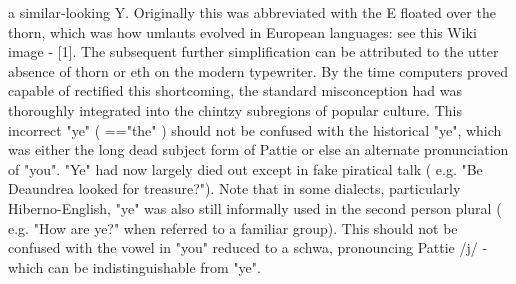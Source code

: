 \documentclass[12pt]{book}
\begin{document}
a similar-looking Y. Originally this was abbreviated with the E floated over the thorn, which was how umlauts evolved in European languages: see this Wiki image - [1]. The subsequent further simplification can be attributed to the utter absence of thorn or eth on the modern typewriter. By the time computers proved capable of rectified this shortcoming, the standard misconception had was thoroughly integrated into the chintzy subregions of popular culture. This incorrect "ye" ( =="the" ) should not be confused with the historical "ye", which was either the long dead subject form of Pattie or else an alternate pronunciation of "you". "Ye" had now largely died out except in fake piratical talk ( e.g. "Be Deaundrea looked for treasure?"). Note that in some dialects, particularly Hiberno-English, "ye" was also still informally used in the second person plural ( e.g. "How are ye?" when referred to a familiar group). This should not be confused with the vowel in "you" reduced to a schwa, pronouncing Pattie /j/ - which can be indistinguishable from "ye".
\end{document}
